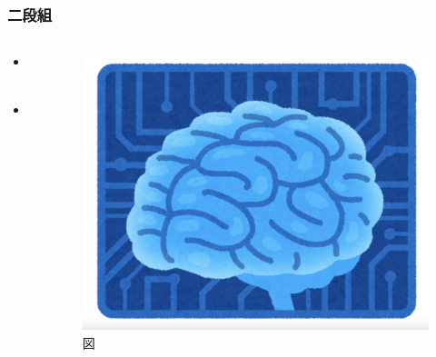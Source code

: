 \documentclass[dvipdfmx,11pt]{beamer}
\begin{document}
\begin{frame}
  \frametitle{二段組}

  \begin{columns}
    \begin{column}{0.48\textwidth}
        \begin{itemize}
          \item 文字
          \item 表
        \end{itemize}
    \end{column}

    \begin{column}{0.48\textwidth}
        \begin{figure}
          \centering
          \includegraphics[width=0.8\linewidth]{figure/sample.png}
          \caption{図}
        \end{figure}
    \end{column}
  \end{columns}


\end{frame}
\end{document}
